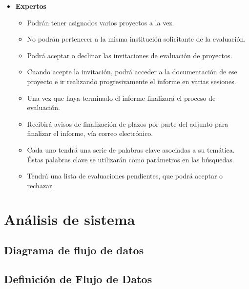 \documentclass[12pt,a4paper,spanish,twoside]{article}
\begin{document}
\begin{itemize}
\item \textbf{Expertos}
\begin{itemize}
\item Podrán tener asignados varios proyectos a la vez. 
\item No podrán pertenecer a la misma institución solicitante de la evaluación.
\item Podrá aceptar o declinar las invitaciones de evaluación de proyectos.
\item Cuando acepte la invitación, podrá acceder a la documentación de ese proyecto e ir realizando 
progresivamente el informe en varias sesiones.
\item Una vez que haya terminado el informe finalizará el proceso de evaluación.
\item Recibirá avisos de finalización de plazos por parte del adjunto para finalizar el informe, 
vía correo electrónico.
\item Cada uno tendrá una serie de palabras clave asociadas a su temática. Éstas palabras clave se 
utilizarán como parámetros en las búsquedas.
\item Tendrá una lista de evaluaciones pendientes, que podrá aceptar o rechazar.
\end{itemize}

\end{itemize}

\section{Análisis de sistema}
\subsection{Diagrama de flujo de datos}


\subsection{Definición de Flujo de Datos}

\end{document}
